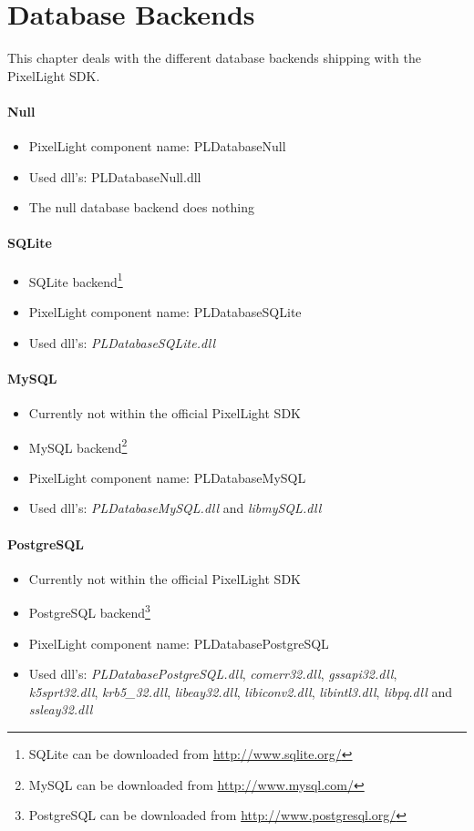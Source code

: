 \section{Database Backends}
This chapter deals with the different database backends shipping with the PixelLight SDK.


\paragraph{Null}
\begin{itemize}
\item PixelLight component name: PLDatabaseNull
\item Used dll's: PLDatabaseNull.dll
\item The null database backend does nothing
\end{itemize}


\paragraph{SQLite}
\begin{itemize}
\item SQLite backend\footnote{SQLite can be downloaded from \url{http://www.sqlite.org/}}
\item PixelLight component name: PLDatabaseSQLite
\item Used dll's: \emph{PLDatabaseSQLite.dll}
\end{itemize}


\paragraph{MySQL}
\begin{itemize}
\item Currently not within the official PixelLight SDK
\item MySQL backend\footnote{MySQL can be downloaded from \url{http://www.mysql.com/}}
\item PixelLight component name: PLDatabaseMySQL
\item Used dll's: \emph{PLDatabaseMySQL.dll} and \emph{libmySQL.dll}
\end{itemize}


\paragraph{PostgreSQL}
\begin{itemize}
\item Currently not within the official PixelLight SDK
\item PostgreSQL backend\footnote{PostgreSQL can be downloaded from \url{http://www.postgresql.org/}}
\item PixelLight component name: PLDatabasePostgreSQL
\item Used dll's: \emph{PLDatabasePostgreSQL.dll}, \emph{comerr32.dll}, \emph{gssapi32.dll}, \emph{k5sprt32.dll}, \emph{krb5\_32.dll}, \emph{libeay32.dll}, \emph{libiconv2.dll}, \emph{libintl3.dll}, \emph{libpq.dll} and \emph{ssleay32.dll}
\end{itemize}
